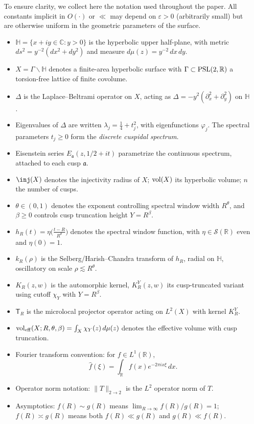 To ensure clarity, we collect here the notation used throughout the paper. All constants
implicit in $O(\cdot)$ or $\ll$ may depend on $\varepsilon > 0$ (arbitrarily small) but
are otherwise uniform in the geometric parameters of the surface.

\begin{itemize}
  \item $\mathbb{H} = \{x+iy \in \mathbb{C} : y>0\}$ is the hyperbolic upper half-plane,
        with metric $ds^2 = y^{-2}(dx^2+dy^2)$ and measure $d\mu(z) = y^{-2}\,dx\,dy$.
  \item $X = \Gamma \backslash \mathbb{H}$ denotes a finite-area hyperbolic surface with
        $\Gamma \subset \mathrm{PSL}(2,\mathbb{R})$ a torsion-free lattice of finite covolume.
  \item $\Delta$ is the Laplace--Beltrami operator on $X$, acting as
        $\Delta = -y^2(\partial_x^2+\partial_y^2)$ on $\mathbb{H}$.
  \item Eigenvalues of $\Delta$ are written $\lambda_j = \tfrac14 + t_j^2$, with
        eigenfunctions $\varphi_j$. The spectral parameters $t_j \ge 0$ form the
        \emph{discrete cuspidal spectrum}.
  \item Eisenstein series $E_\mathfrak{a}(z,1/2+it)$ parametrize the continuous spectrum,
        attached to each cusp $\mathfrak{a}$.
  \item $\inj(X)$ denotes the injectivity radius of $X$; $\operatorname{vol}(X)$ its hyperbolic volume;
        $n$ the number of cusps.
  \item $\theta \in (0,1)$ denotes the exponent controlling spectral window width
        $R^\theta$, and $\beta \ge 0$ controls cusp truncation height $Y = R^\beta$.
  \item $h_R(t) = \eta\!\big(\tfrac{t-R}{R^\theta}\big)$ denotes the spectral window
        function, with $\eta \in \mathcal{S}(\mathbb{R})$ even and $\eta(0)=1$.
  \item $k_R(\rho)$ is the Selberg/Harish--Chandra transform of $h_R$, radial on
        $\mathbb{H}$, oscillatory on scale $\rho \lesssim R^\theta$.
  \item $K_R(z,w)$ is the automorphic kernel, $K_R^Y(z,w)$ its cusp-truncated variant
        using cutoff $\chi_Y$ with $Y=R^\beta$.
  \item $\mathsf{T}_R$ is the microlocal projector operator acting on $L^2(X)$ with kernel
        $K_R^Y$.
  \item $\operatorname{vol}_{\mathrm{eff}}(X;R,\theta,\beta) = \int_X \chi_Y(z)\,d\mu(z)$ denotes the
        effective volume with cusp truncation.
  \item Fourier transform convention: for $f \in L^1(\mathbb{R})$,
        \[
          \widehat{f}(\xi) = \int_\mathbb{R} f(x) e^{-2\pi i x \xi}\,dx.
        \]
  \item Operator norm notation: $\|T\|_{2\to2}$ is the $L^2$ operator norm of $T$.
  \item Asymptotics: $f(R)\sim g(R)$ means $\lim_{R\to\infty} f(R)/g(R)=1$;
        $f(R)\asymp g(R)$ means both $f(R)\ll g(R)$ and $g(R)\ll f(R)$.
\end{itemize}

